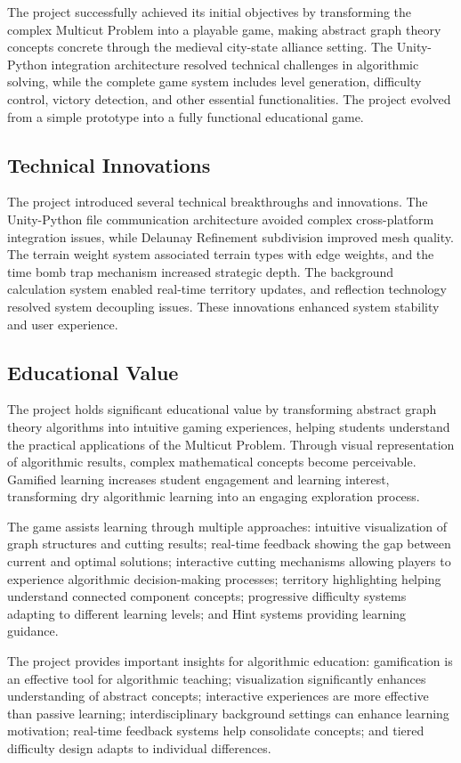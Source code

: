 \documentclass[english]{tudscrreprt}
\begin{document}
The project successfully achieved its initial objectives by transforming the complex Multicut Problem into a playable game, making abstract graph theory concepts concrete through the medieval city-state alliance setting. The Unity-Python integration architecture resolved technical challenges in algorithmic solving, while the complete game system includes level generation, difficulty control, victory detection, and other essential functionalities. The project evolved from a simple prototype into a fully functional educational game.

\subsection{Technical Innovations}
The project introduced several technical breakthroughs and innovations. The Unity-Python file communication architecture avoided complex cross-platform integration issues, while Delaunay Refinement subdivision improved mesh quality. The terrain weight system associated terrain types with edge weights, and the time bomb trap mechanism increased strategic depth. The background calculation system enabled real-time territory updates, and reflection technology resolved system decoupling issues. These innovations enhanced system stability and user experience.

\subsection{Educational Value}
The project holds significant educational value by transforming abstract graph theory algorithms into intuitive gaming experiences, helping students understand the practical applications of the Multicut Problem. Through visual representation of algorithmic results, complex mathematical concepts become perceivable. Gamified learning increases student engagement and learning interest, transforming dry algorithmic learning into an engaging exploration process.

The game assists learning through multiple approaches: intuitive visualization of graph structures and cutting results; real-time feedback showing the gap between current and optimal solutions; interactive cutting mechanisms allowing players to experience algorithmic decision-making processes; territory highlighting helping understand connected component concepts; progressive difficulty systems adapting to different learning levels; and Hint systems providing learning guidance.

The project provides important insights for algorithmic education: gamification is an effective tool for algorithmic teaching; visualization significantly enhances understanding of abstract concepts; interactive experiences are more effective than passive learning; interdisciplinary background settings can enhance learning motivation; real-time feedback systems help consolidate concepts; and tiered difficulty design adapts to individual differences.
\end{document}
